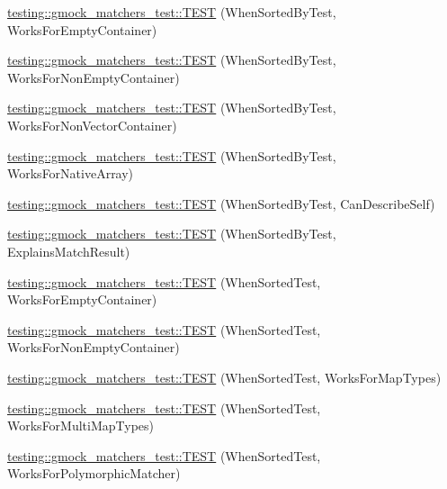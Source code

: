 \begin{DoxyCompactItemize}
\item 
\mbox{\hyperlink{namespacetesting_1_1gmock__matchers__test_a9d88fbc6e2d01b66a1c10b192b25a802}{testing\+::gmock\+\_\+matchers\+\_\+test\+::\+T\+E\+ST}} (When\+Sorted\+By\+Test, Works\+For\+Empty\+Container)
\item 
\mbox{\hyperlink{namespacetesting_1_1gmock__matchers__test_a3095e5533ec12a67377dec6b0769d9a8}{testing\+::gmock\+\_\+matchers\+\_\+test\+::\+T\+E\+ST}} (When\+Sorted\+By\+Test, Works\+For\+Non\+Empty\+Container)
\item 
\mbox{\hyperlink{namespacetesting_1_1gmock__matchers__test_a24d3caacabfef918b7a5b9dacc5e3a66}{testing\+::gmock\+\_\+matchers\+\_\+test\+::\+T\+E\+ST}} (When\+Sorted\+By\+Test, Works\+For\+Non\+Vector\+Container)
\item 
\mbox{\hyperlink{namespacetesting_1_1gmock__matchers__test_a33b65fc6db83270b5c29073dbbf69c4e}{testing\+::gmock\+\_\+matchers\+\_\+test\+::\+T\+E\+ST}} (When\+Sorted\+By\+Test, Works\+For\+Native\+Array)
\item 
\mbox{\hyperlink{namespacetesting_1_1gmock__matchers__test_afc2d1e86837d8e3103748cb2e96b61c3}{testing\+::gmock\+\_\+matchers\+\_\+test\+::\+T\+E\+ST}} (When\+Sorted\+By\+Test, Can\+Describe\+Self)
\item 
\mbox{\hyperlink{namespacetesting_1_1gmock__matchers__test_ada0850ab21beccb47802aab36c06d163}{testing\+::gmock\+\_\+matchers\+\_\+test\+::\+T\+E\+ST}} (When\+Sorted\+By\+Test, Explains\+Match\+Result)
\item 
\mbox{\hyperlink{namespacetesting_1_1gmock__matchers__test_a76aaffd49c78fdee18f11fae5ea3f6fb}{testing\+::gmock\+\_\+matchers\+\_\+test\+::\+T\+E\+ST}} (When\+Sorted\+Test, Works\+For\+Empty\+Container)
\item 
\mbox{\hyperlink{namespacetesting_1_1gmock__matchers__test_a2bfbef7e777d319e3d96fc98340bb558}{testing\+::gmock\+\_\+matchers\+\_\+test\+::\+T\+E\+ST}} (When\+Sorted\+Test, Works\+For\+Non\+Empty\+Container)
\item 
\mbox{\hyperlink{namespacetesting_1_1gmock__matchers__test_acc4a96f3aa369fda8f554f5ac4495f4b}{testing\+::gmock\+\_\+matchers\+\_\+test\+::\+T\+E\+ST}} (When\+Sorted\+Test, Works\+For\+Map\+Types)
\item 
\mbox{\hyperlink{namespacetesting_1_1gmock__matchers__test_ab5de36ad02781be67163ae24d08b5454}{testing\+::gmock\+\_\+matchers\+\_\+test\+::\+T\+E\+ST}} (When\+Sorted\+Test, Works\+For\+Multi\+Map\+Types)
\item 
\mbox{\hyperlink{namespacetesting_1_1gmock__matchers__test_a587c3799433426782ccdcfe5cb07f5bc}{testing\+::gmock\+\_\+matchers\+\_\+test\+::\+T\+E\+ST}} (When\+Sorted\+Test, Works\+For\+Polymorphic\+Matcher)

\end{DoxyCompactItemize}

